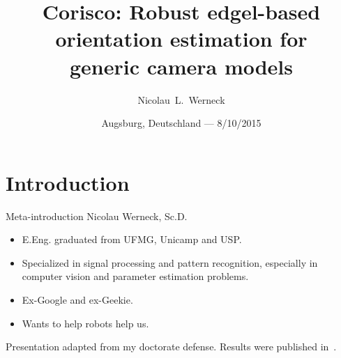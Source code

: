 \usepackage{calc}
\usepackage[center]{caption}


\graphicspath{{./figures/}}


\usepackage{setspace}

\renewcommand{\thefootnote}{\fnsymbol{footnote}}



\title[Defesa de doutorado]{Corisco: Robust edgel-based orientation estimation for\\ generic camera models}

\author[N. Werneck]{Nicolau~L.~Werneck\\
\usebox{\myurl}
}



\date{Augsburg, Deutschland --- 8/10/2015}










\begin{frame}[plain]
  \titlepage
\end{frame}
\addtocounter{framenumber}{-1}




\section[1--Introdução]{Introduction}

\begin{frame}{Meta-introduction}
Nicolau Werneck, Sc.D.
\begin{itemize}
\item E.Eng. graduated from UFMG, Unicamp and USP.
\item Specialized in signal processing and pattern recognition, especially in computer vision and parameter estimation problems.
\item Ex-Google and ex-Geekie.
\item Wants to help robots help us.
\end{itemize}

Presentation adapted from my doctorate defense. Results were published in~\citet{Werneck2013}.

\end{frame}


